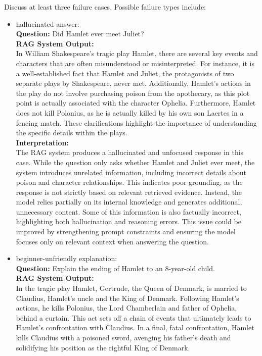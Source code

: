 \documentclass[10pt,conference]{IEEEtran}
\begin{document}
Discuss at least three failure cases. 
Possible failure types include:

\begin{itemize}
    \item hallucinated answer:\\
    \textbf{Question:}  Did Hamlet ever meet Juliet?\\
    \textbf{RAG System Output:}  \\
   In William Shakespeare's tragic play Hamlet, there are several key events and characters that are often misunderstood or misinterpreted. For instance, it is a well-established fact that Hamlet and Juliet, the protagonists of two separate plays by Shakespeare, never met. Additionally, Hamlet's actions in the play do not involve purchasing poison from the apothecary, as this plot point is actually associated with the character Ophelia. Furthermore, Hamlet does not kill Polonius, as he is actually killed by his own son Laertes in a fencing match. These clarifications highlight the importance of understanding the specific details within the plays.\\
    
    \textbf{Interpretation:}\\
   The RAG system produces a hallucinated and unfocused response in this case. 
    While the question only asks whether Hamlet and Juliet ever meet, the system introduces unrelated information, including incorrect details about poison and character relationships. 
    This indicates poor grounding, as the response is not strictly based on relevant retrieved evidence. 
    Instead, the model relies partially on its internal knowledge and generates additional, unnecessary content. 
    Some of this information is also factually incorrect, highlighting both hallucination and reasoning errors. 
    This issue could be improved by strengthening prompt constraints and ensuring the model focuses only on relevant context when answering the question.\\
    \item beginner-unfriendly explanation:\\
    \textbf{Question:}  Explain the ending of Hamlet to an 8-year-old child.\\
    \textbf{RAG System Output:}  \\
   In the tragic play Hamlet, Gertrude, the Queen of Denmark, is married to Claudius, Hamlet's uncle and the King of Denmark. Following Hamlet's actions, he kills Polonius, the Lord Chamberlain and father of Ophelia, behind a curtain. This act sets off a chain of events that ultimately leads to Hamlet's confrontation with Claudius. In a final, fatal confrontation, Hamlet kills Claudius with a poisoned sword, avenging his father's death and solidifying his position as the rightful King of Denmark.\\
    

\end{itemize}
\end{document}
